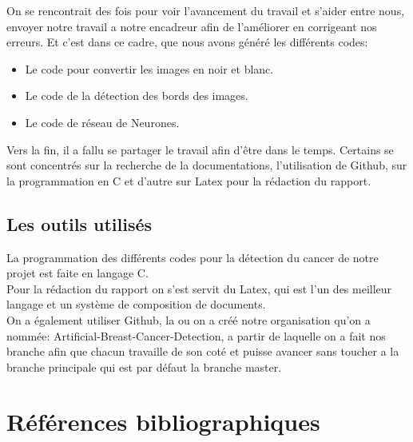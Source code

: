 \documentclass[a4paper,12pt]{report}
\begin{document}
On se rencontrait des fois pour voir l'avancement  du travail et s'aider entre nous, envoyer notre travail a notre encadreur afin de l'améliorer en corrigeant nos erreurs. Et c'est dans ce cadre, que nous avons généré les différents codes:\\
\begin{itemize}
      \item [\star] Le code pour convertir les images en noir et blanc.
      \item [\star] Le code de la détection des bords des images.
      \item [\star] Le code de réseau de Neurones.\\
    \end{itemize}
    
Vers la fin, il a fallu se partager le travail afin d’être dans le temps. Certains se sont concentrés sur la recherche de la documentations, l'utilisation de Github, sur la programmation en C et d’autre sur Latex pour la rédaction du rapport.

\section{Les outils utilisés}
La programmation des différents codes pour la détection du cancer de notre projet est faite en langage C.\\

Pour la rédaction du rapport on s'est servit du Latex, qui est l'un des meilleur langage et un système de composition de documents.\\

On a également utiliser Github, la ou on a créé notre organisation qu'on a nommée: Artificial-Breast-Cancer-Detection, a partir de laquelle on a fait nos branche afin que chacun travaille de son coté et puisse avancer sans toucher a la branche principale qui est par défaut la branche master. 


\chapter*{Références bibliographiques}
\end{document}

